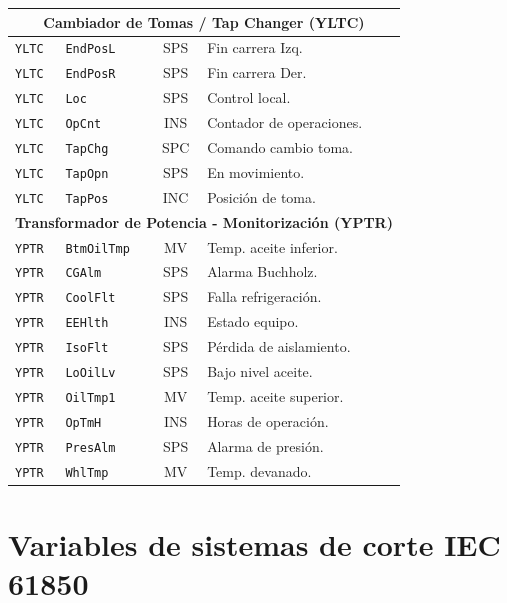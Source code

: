 \begin{longtable}{l l c p{7cm}}
    \multicolumn{4}{c}{\textbf{Cambiador de Tomas / Tap Changer (YLTC)}} \\ \midrule
    \texttt{YLTC} & \texttt{EndPosL} & SPS & Fin carrera Izq. \\
    \texttt{YLTC} & \texttt{EndPosR} & SPS & Fin carrera Der. \\
    \texttt{YLTC} & \texttt{Loc} & SPS & Control local. \\
    \texttt{YLTC} & \texttt{OpCnt} & INS & Contador de operaciones. \\
    \texttt{YLTC} & \texttt{TapChg} & SPC & Comando cambio toma. \\
    \texttt{YLTC} & \texttt{TapOpn} & SPS & En movimiento. \\
    \texttt{YLTC} & \texttt{TapPos} & INC & Posición de toma. \\
    \midrule
    
    \multicolumn{4}{c}{\textbf{Transformador de Potencia - Monitorización (YPTR)}} \\ \midrule
    \texttt{YPTR} & \texttt{BtmOilTmp} & MV & Temp. aceite inferior. \\
    \texttt{YPTR} & \texttt{CGAlm} & SPS & Alarma Buchholz. \\
    \texttt{YPTR} & \texttt{CoolFlt} & SPS & Falla refrigeración. \\
    \texttt{YPTR} & \texttt{EEHlth} & INS & Estado equipo. \\
    \texttt{YPTR} & \texttt{IsoFlt} & SPS & Pérdida de aislamiento. \\
    \texttt{YPTR} & \texttt{LoOilLv} & SPS & Bajo nivel aceite. \\
    \texttt{YPTR} & \texttt{OilTmp1} & MV & Temp. aceite superior. \\
    \texttt{YPTR} & \texttt{OpTmH} & INS & Horas de operación. \\
    \texttt{YPTR} & \texttt{PresAlm} & SPS & Alarma de presión. \\
    \texttt{YPTR} & \texttt{WhlTmp} & MV & Temp. devanado. \\

\end{longtable}
\section{Variables de sistemas de corte IEC 61850}

